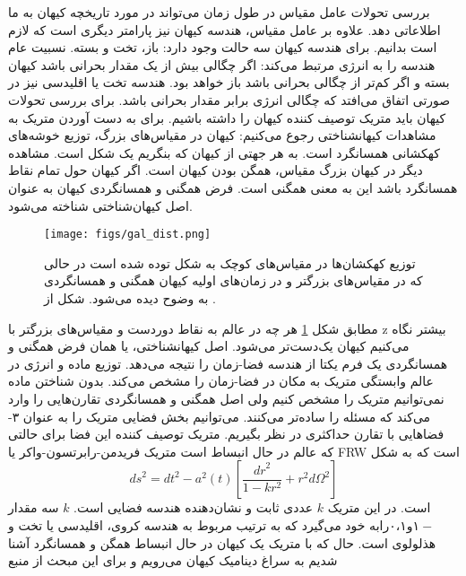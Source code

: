 بررسی تحولات عامل مقیاس در طول زمان می‌تواند در مورد تاریخچه کیهان به ما اطلاعاتی دهد. علاوه بر عامل مقیاس، هندسه کیهان نیز پارامتر دیگری است که لازم است بدانیم. برای هندسه کیهان سه حالت وجود دارد: باز، تخت و بسته. نسبیت عام هندسه را به انرژی مرتبط می‌کند: اگر چگالی بیش از یک مقدار بحرانی باشد کیهان بسته و اگر کم‌تر از چگالی بحرانی باشد باز خواهد بود. هندسه تخت یا اقلیدسی نیز در صورتی اتفاق می‌افتد که چگالی انرژی برابر مقدار بحرانی باشد. 
برای بررسی تحولات کیهان باید متریک
توصیف کننده کیهان را داشته باشیم. برای به دست آوردن متریک به مشاهدات کیهانشناختی رجوع می‌کنیم: کیهان در مقیاس‌های بزرگ، توزیع خوشه‌های کهکشانی همسانگرد 
است. به هر جهتی از کیهان که بنگریم یک شکل است. مشاهده دیگر در کیهان بزرگ مقیاس، همگن 
بودن کیهان است. اگر کیهان حول تمام نقاط همسانگرد باشد این به معنی همگنی است. فرض همگنی و همسانگردی کیهان به عنوان اصل کیهان‌شناختی
 شناخته می‌شود.
\cite{baumann2014cosmology}  
\begin{figure}[h!]
	\begin{center}
		\texttt{[image: figs/gal\_dist.png]}
	\end{center}
	\caption{ 
  توزیع کهکشان‌‌ها در مقیاس‌های کوچک به شکل توده‌ شده است در حالی که در مقیاس‌های بزرگتر و در زمان‌های اولیه کیهان همگنی و همسانگردی به وضوح دیده می‌شود. شکل از 
		\cite{baumann2014cosmology}
	.}
	\label{fig:gal_dist}
\end{figure}
مطابق شکل
\ref{fig:gal_dist}
هر چه در عالم به نقاط دوردست و مقیاس‌های بزرگتر با z بیشتر نگاه می‌کنیم کیهان یک‌دست‌تر می‌شود. اصل کیهانشناختی، یا همان فرض همگنی و همسانگردی یک فرم یکتا از هندسه فضا-زمان را نتیجه می‌دهد. توزیع ماده و انرژی در عالم وابستگی متریک به مکان در فضا-زمان را مشخص می‌کند. بدون شناختن ماده نمی‌توانیم متریک را مشخص کنیم ولی اصل همگنی و همسانگردی تقارن‌هایی را وارد می‌کند که مسئله را ساده‌تر می‌کنند. می‌توانیم بخش فضایی متریک را به عنوان ۳-فضاهایی با تقارن حداکثری در نظر بگیریم. متریک توصیف کننده این فضا برای حالتی که عالم در حال انبساط است متریک فریدمن-رابرتسون-واکر
 یا FRW است که به شکل 
 \begin{equation}
 {ds}^2 = {dt}^2 - a^2(t) [ \frac{{dr}^2}{1-kr^2}	+ r^2 {d\Omega}^2]
 \end{equation} 
    است. در این متریک $k$ عددی ثابت و نشان‌دهنده هندسه فضایی است. $k$  سه مقدار $ ۰،۱ و ۱- $رابه خود می‌گیرد که به ترتیب مربوط به هندسه کروی، اقلیدسی یا تخت و هذلولوی است. حال که با متریک یک کیهان در حال انبساط همگن و همسانگرد آشنا شدیم به سراغ دینامیک کیهان می‌رویم و برای این مبحث از منبع 
